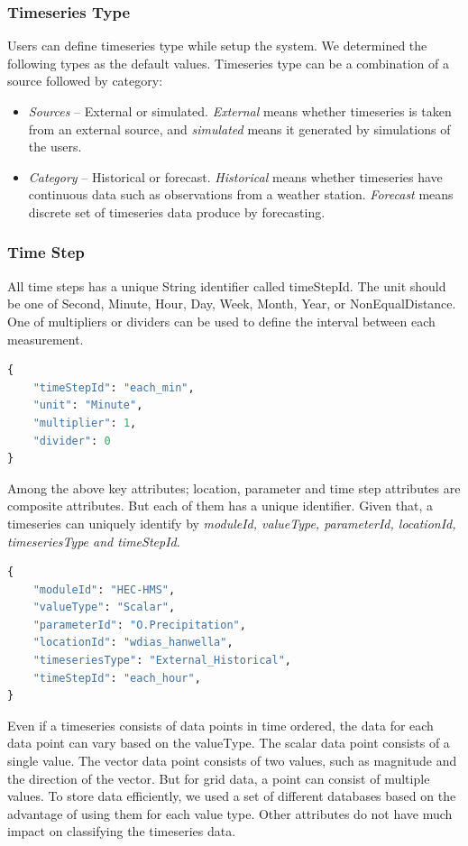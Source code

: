 \subsubsection{Timeseries Type}
Users can define timeseries type while setup the system. We determined the following types as the default values. Timeseries type can be a combination of a source followed by category:
\begin{itemize}
  \item \emph{Sources} -- External or simulated. \emph{External} means whether timeseries is taken from an external source, and \emph{simulated} means it generated by simulations of the users.
  \item \emph{Category} -- Historical or forecast. \emph{Historical} means whether timeseries have continuous data such as observations from a weather station. \emph{Forecast} means discrete set of timeseries data produce by forecasting.
\end{itemize}

\subsubsection{Time Step}
All time steps has a unique String identifier called timeStepId. The unit should be one of Second, Minute, Hour, Day, Week, Month, Year, or NonEqualDistance. One of multipliers or dividers can be used to define the interval between each measurement.
\begin{lstlisting}[language=Python]
{
    "timeStepId": "each_min",
    "unit": "Minute",
    "multiplier": 1,
    "divider": 0
}
\end{lstlisting}

Among the above key attributes; location, parameter and time step attributes are composite attributes. But each of them has a unique identifier.
Given that, a timeseries can uniquely identify by \emph{moduleId, valueType, parameterId, locationId, timeseriesType and timeStepId}.
\begin{lstlisting}[language=Python]
{
	"moduleId": "HEC-HMS",
	"valueType": "Scalar",
	"parameterId": "O.Precipitation",
	"locationId": "wdias_hanwella",
	"timeseriesType": "External_Historical",
	"timeStepId": "each_hour",
}
\end{lstlisting}

Even if a timeseries consists of data points in time ordered, the data for each data point can vary based on the valueType. The scalar data point consists of a single value. The vector data point consists of two values, such as magnitude and the direction of the vector. But for grid data, a point can consist of multiple values. To store data efficiently, we used a set of different databases based on the advantage of using them for each value type. Other attributes do not have much impact on classifying the timeseries data.

